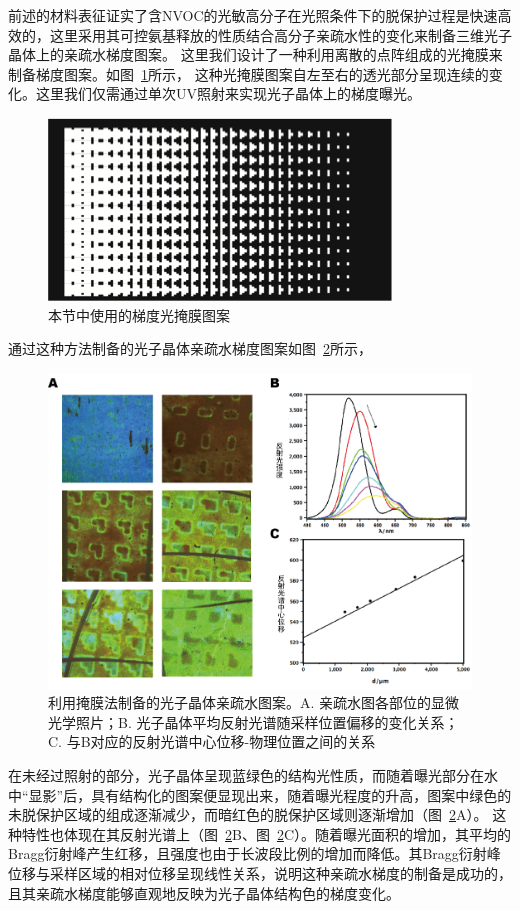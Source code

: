 前述的材料表征证实了含NVOC的光敏高分子在光照条件下的脱保护过程是快速高效的，这里采用其可控氨基释放的性质结合高分子亲疏水性的变化来制备三维光子晶体上的亲疏水梯度图案。
这里我们设计了一种利用离散的点阵组成的光掩膜来制备梯度图案。如图~\ref{fig:photomask}所示，
这种光掩膜图案自左至右的透光部分呈现连续的变化。这里我们仅需通过单次UV照射来实现光子晶体上的梯度曝光。
\begin{figure}[htbp]
  \centering
  \includegraphics[width=0.45\linewidth]{figures/ch4/photomask.png}
  \caption{本节中使用的梯度光掩膜图案}
  \label{fig:photomask}
\end{figure}

通过这种方法制备的光子晶体亲疏水梯度图案如图~\ref{fig:photomask-gradient}所示，
\begin{figure}[htbp]
  \centering
  \includegraphics[width=0.85\linewidth]{figures/ch4/mask-gradient.png}
  \caption{利用掩膜法制备的光子晶体亲疏水图案。A. 亲疏水图各部位的显微光学照片；B. 光子晶体平均反射光谱随采样位置偏移的变化关系；C. 与B对应的反射光谱中心位移-物理位置之间的关系}
  \label{fig:photomask-gradient}
\end{figure}
在未经过照射的部分，光子晶体呈现蓝绿色的结构光性质，而随着曝光部分在水中“显影”后，具有结构化的图案便显现出来，随着曝光程度的升高，图案中绿色的未脱保护区域的组成逐渐减少，而暗红色的脱保护区域则逐渐增加（图~\ref{fig:photomask-gradient}A）。
这种特性也体现在其反射光谱上（图~\ref{fig:photomask-gradient}B、图~\ref{fig:photomask-gradient}C）。随着曝光面积的增加，其平均的Bragg衍射峰产生红移，且强度也由于长波段比例的增加而降低。其Bragg衍射峰位移与采样区域的相对位移呈现线性关系，说明这种亲疏水梯度的制备是成功的，且其亲疏水梯度能够直观地反映为光子晶体结构色的梯度变化。


